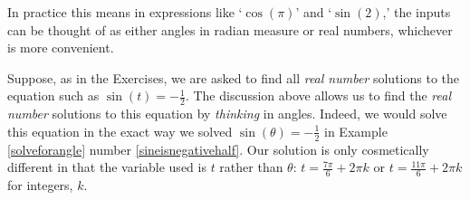 \documentclass{ximera}
\begin{document}
\begin{image}
\end{image}

In practice this means in expressions like `$\cos(\pi)$' and `$\sin(2)$,'  the inputs can be thought of as either angles in radian measure or real numbers, whichever is more convenient.  



Suppose, as in the Exercises, we are asked to find all \textit{real number} solutions to the equation such as $\sin(t) = -\frac{1}{2}$.   The discussion above allows us to find  the \textit{real number} solutions to this equation by \textit{thinking} in angles.  Indeed, we would solve this equation in the exact way we solved $\sin(\theta) = -\frac{1}{2}$ in  Example \ref{solveforangle} number \ref{sineisnegativehalf}.  Our solution is only cosmetically different in that the variable used is $t$ rather than $\theta$:  $t = \frac{7\pi}{6} + 2\pi k$ or  $t = \frac{11\pi}{6} + 2\pi k$ for integers, $k$.  
\end{document}

